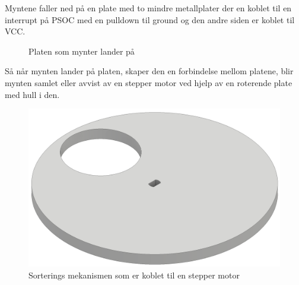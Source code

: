 \documentclass[HardwareDesign/HardwareDesign_main.tex]{subfiles}
\begin{document}
Myntene faller ned på en plate med to mindre metallplater der en koblet til en interrupt på PSOC med en pulldown til ground og den andre siden er koblet til VCC.

\begin{figure}[H]
    \centering
    \caption{Platen som mynter lander på}
\end{figure}

Så når mynten lander på platen, skaper den en forbindelse mellom platene, blir mynten samlet eller avvist av en stepper motor ved hjelp av en roterende plate med hull i den.

\begin{figure}[H]
    \centering
    \includegraphics[width=1\linewidth]{HardwareDesign/CoinDispenser/Graphics/disk.png}
    \caption{Sorterings mekanismen som er koblet til en stepper motor}
\end{figure}
\end{document}
